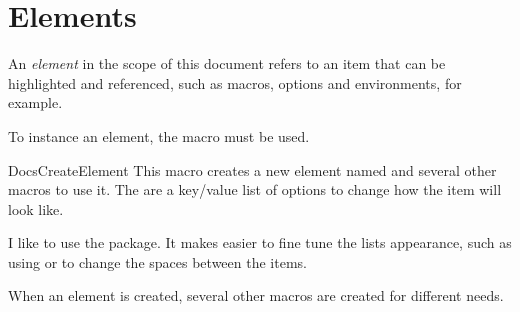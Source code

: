 \documentclass[11pt, outputdir = ./out]{article}
\begin{document}
\section{Elements}

An \textit{element} in the scope of this document refers to an item that can be highlighted and referenced, such as macros, options and environments, for example.

To instance an element, the  macro must be used.

\begin{Macrodef}{DocsCreateElement}{}{}
    This macro creates a new element named  and several other macros to use it. The  are a key/value list of options to change how the item will look like.

    \begin{latexcode}
    \end{latexcode}

    \begin{example}{}
        I like to use the  package. It makes easier to fine tune the lists appearance, such as using  or  to change the spaces between the items.
    \end{example}

    When an element is created, several other macros are created for different needs.


\end{Macrodef}
\end{document}
